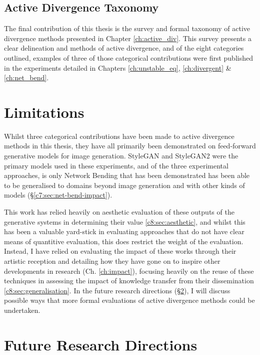 \subsection{Active Divergence Taxonomy}

The final contribution of this thesis is the survey and formal taxonomy of active divergence methods presented in Chapter \ref{ch:active_div}.
This survey presents a clear delineation and methods of active divergence, and of the eight categories outlined, examples of three of those categorical contributions were first published in the experiments detailed in Chapters \ref{ch:unstable_eq}, \ref{ch:divergent}  \& \ref{ch:net_bend}.

\section{Limitations}

Whilst three categorical contributions have been made to active divergence methods in this thesis, they have all primarily been demonstrated on feed-forward generative models for image generation.
StyleGAN \citep{karras2019style} and StyleGAN2 \citep{karras2019analyzing} were the primary models used in these experiments, and of the three experimental approaches, is only Network Bending that has been demonstrated has been able to be generalised to domains beyond image generation and with other kinds of models (\S \ref{c7:sec:net-bend-impact}).

This work has relied heavily on aesthetic evaluation of these outputs of the generative systems in determining their value \ref{c8:sec:aesthetic}, and whilst this has been a valuable yard-stick in evaluating approaches that do not have clear means of quantitive evaluation, this does restrict the weight of the evaluation.
Instead, I have relied on evaluating the impact of these works through their artistic reception and detailing how they have gone on to inspire other developments in research (Ch. \ref{ch:impact}), focusing heavily on the reuse of these techniques in assessing the impact of knowledge transfer from their dissemination \ref{c8:sec:generalisation}.
In the future research directions (\S \ref{c9:sec:future}), I will discuss possible ways that more formal evaluations of active divergence methods could be undertaken.

\section{Future Research Directions}
\label{c9:sec:future}

